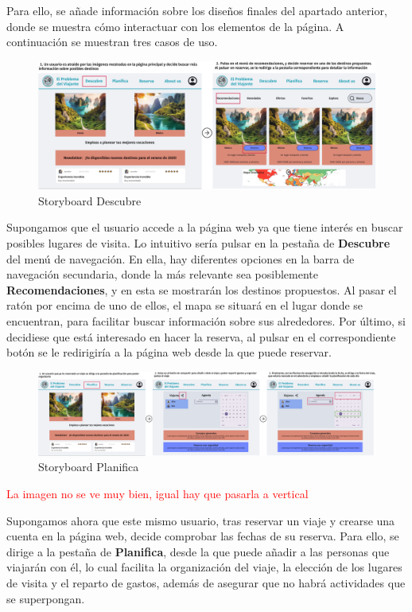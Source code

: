 \documentclass[11pt, a4paper]{book}
\begin{document}
	Para ello, se añade información sobre los diseños finales del apartado anterior, donde se muestra cómo interactuar con los elementos de la página. A continuación se muestran tres casos de uso.
	
	\begin{figure} [H]
		\centering
		\includegraphics[width=\textwidth]{storyboard-descubrir.png}
		\caption{Storyboard Descubre}
	\end{figure}

	Supongamos que el usuario accede a la página web ya que tiene interés en buscar posibles lugares de visita. Lo intuitivo sería pulsar en la pestaña de \textbf{Descubre} del menú de navegación. En ella, hay diferentes opciones en la barra de navegación secundaria, donde la más relevante sea posiblemente \textbf{Recomendaciones}, y en esta se mostrarán los destinos propuestos. Al pasar el ratón por encima de uno de ellos, el mapa se situará en el lugar donde se encuentran, para facilitar buscar información sobre sus alrededores. Por último, si decidiese que está interesado en hacer la reserva, al pulsar en el correspondiente botón se le redirigiría a la página web desde la que puede reservar.

	\begin{figure} [H]
		\centering
		\includegraphics[width=\textwidth]{storyboard-planificar.png}
		\caption{Storyboard Planifica}
	\end{figure}

	\textcolor{red}{La imagen no se ve muy bien, igual hay que pasarla a vertical}
	
	Supongamos ahora que este mismo usuario, tras reservar un viaje y crearse una cuenta en la página web, decide comprobar las fechas de su reserva. Para ello, se dirige a la pestaña de \textbf{Planifica}, desde la que puede añadir a las personas que viajarán con él, lo cual facilita la organización del viaje, la elección de los lugares de visita y el reparto de gastos, además de asegurar que no habrá actividades que se superpongan.
	
\end{document}
